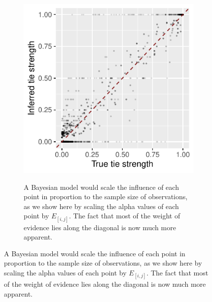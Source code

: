 \documentclass[Afour,sageh,times]{sagej}
\begin{document}
\begin{figure}[h]
  \begin{subfigure}[b]{0.4\textwidth}
         \centering
         \caption{A Bayesian model would scale the influence of each point in proportion to the sample size of observations, as we show here by scaling the alpha values of each point by $E_{[i,j]}$. The fact that most of the weight of evidence lies along the diagonal is now much more apparent.}
         \includegraphics[trim={0 0cm 0 0},clip,width=\textwidth]{Figures/ScatterFrameB.pdf}
         \label{srmx3b_drs}
     \end{subfigure}
\end{figure}
\end{document}
